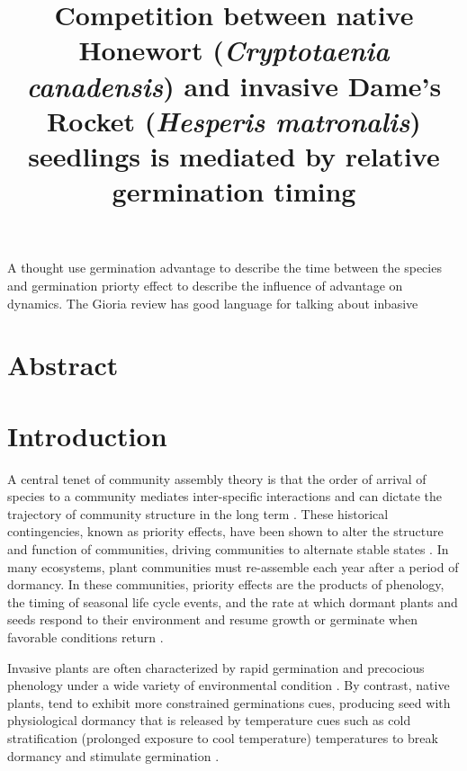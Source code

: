 \documentclass{article}\usepackage[]{graphicx}\usepackage[]{color}
\title{Competition between native Honewort (\textit{Cryptotaenia canadensis}) and invasive Dame's Rocket (\textit{Hesperis matronalis}) seedlings is mediated by relative germination timing}
\begin{document}
\maketitle


A thought use germination advantage to describe the time between the species and germination priorty effect to describe the influence of advantage on dynamics. The Gioria review has good language for talking about inbasive
\section*{Abstract}
\section*{Introduction}
 A central tenet of community assembly theory is that the order of arrival of species to a community mediates inter-specific interactions and can dictate the trajectory of community structure in the long term \citep{Fukami2015}. These historical contingencies, known as priority effects, have been shown to alter the structure and function of communities, driving communities to alternate stable states \citep{Fukami2011}. In many ecosystems, plant communities must re-assemble each year after a period of dormancy. In these communities, priority effects are the products of phenology, the timing of seasonal life cycle events, and the rate at which dormant plants and seeds respond to their environment and resume growth or germinate when favorable conditions return \citep{Rudolf:2019aa}.%

Invasive plants are often characterized by rapid germination and precocious phenology under a wide variety of environmental condition \citep{Gioria2018,Gioria:2017wo,Wolkovich:2011uh,Smith:2013uj}. By contrast, native plants, tend to exhibit more constrained germinations cues\citep{Marushia:2010ug}, producing seed with physiological dormancy that is released by temperature cues such as cold stratification (prolonged exposure to cool temperature) temperatures to break dormancy and stimulate germination \citep{Brink:2013wr,Cavieres:2017aa,Bradford:2007tj} .%
\end{document}
